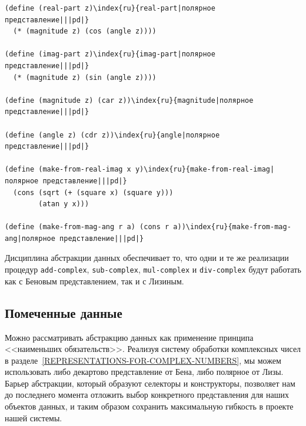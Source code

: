 \begin{Verbatim}[fontsize=\small]
(define (real-part z)\index{ru}{real-part|полярное представление|||pd|}
  (* (magnitude z) (cos (angle z))))

(define (imag-part z)\index{ru}{imag-part|полярное представление|||pd|}
  (* (magnitude z) (sin (angle z))))

(define (magnitude z) (car z))\index{ru}{magnitude|полярное представление|||pd|}

(define (angle z) (cdr z))\index{ru}{angle|полярное представление|||pd|}

(define (make-from-real-imag x y)\index{ru}{make-from-real-imag|полярное представление|||pd|}
  (cons (sqrt (+ (square x) (square y)))
        (atan y x)))

(define (make-from-mag-ang r a) (cons r a))\index{ru}{make-from-mag-ang|полярное представление|||pd|}
\end{Verbatim}

Дисциплина абстракции данных обеспечивает то, что
одни и те же реализации процедур {\tt add-complex},
{\tt sub-complex}, {\tt mul-complex} и
{\tt div-complex} будут работать как с Беновым представлением,
так и с Лизиным.

\subsection{Помеченные данные}
\label{TAGGED-DATA}


Можно
рассматривать абстракцию данных как применение
принципа <<наименьших обязательств>>.  Реализуя систему обработки
комплексных чисел в разделе~\ref{REPRESENTATIONS-FOR-COMPLEX-NUMBERS}, 
мы можем использовать либо декартово представление от Бена, либо
полярное от Лизы.  Барьер абстракции, который образуют селекторы и
конструкторы, позволяет нам до последнего момента отложить выбор конкретного представления
для наших объектов данных, и таким образом
сохранить максимальную гибкость в проекте нашей системы.
{\sloppy

}%

